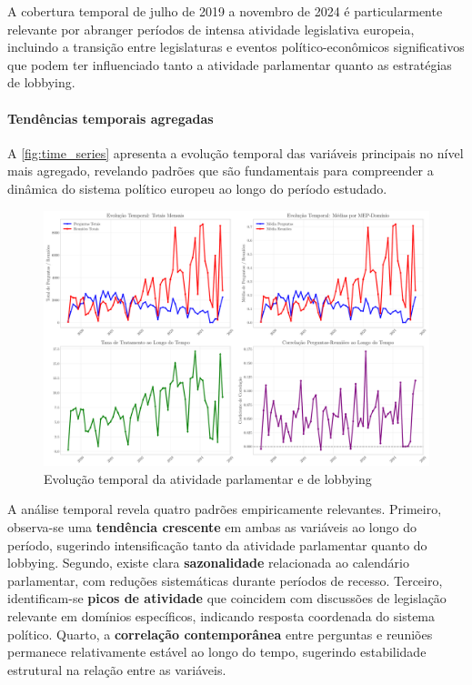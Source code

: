 A cobertura temporal de julho de 2019 a novembro de 2024 é particularmente relevante por abranger períodos de intensa atividade legislativa europeia, incluindo a transição entre legislaturas e eventos político-econômicos significativos que podem ter influenciado tanto a atividade parlamentar quanto as estratégias de lobbying.

\paragraph{Tendências temporais agregadas}

A \autoref{fig:time_series} apresenta a evolução temporal das variáveis principais no nível mais agregado, revelando padrões que são fundamentais para compreender a dinâmica do sistema político europeu ao longo do período estudado.

\begin{figure}[htbp]
\centering
\includegraphics[width=\textwidth]{figures/fig2_time_series_analysis.pdf}
\caption{Evolução temporal da atividade parlamentar e de lobbying}
\label{fig:time_series}
\end{figure}

A análise temporal revela quatro padrões empiricamente relevantes. Primeiro, observa-se uma \textbf{tendência crescente} em ambas as variáveis ao longo do período, sugerindo intensificação tanto da atividade parlamentar quanto do lobbying. Segundo, existe clara \textbf{sazonalidade} relacionada ao calendário parlamentar, com reduções sistemáticas durante períodos de recesso. Terceiro, identificam-se \textbf{picos de atividade} que coincidem com discussões de legislação relevante em domínios específicos, indicando resposta coordenada do sistema político. Quarto, a \textbf{correlação contemporânea} entre perguntas e reuniões permanece relativamente estável ao longo do tempo, sugerindo estabilidade estrutural na relação entre as variáveis.

